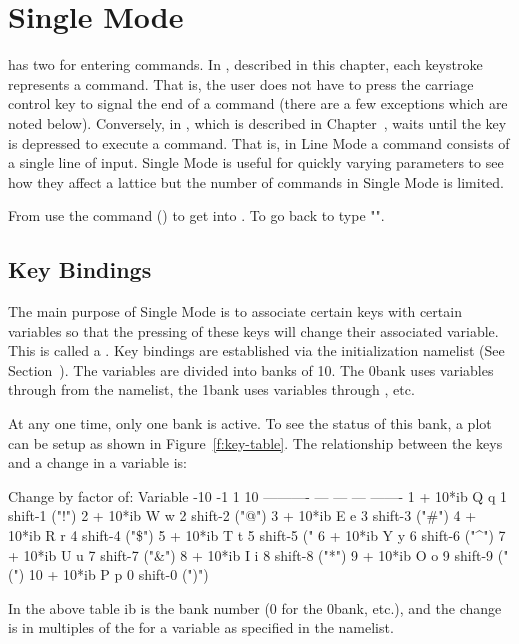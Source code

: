 \chapter{Single Mode}
\label{c:single}

\tao has two  for entering commands. In ,
described in this chapter, each keystroke represents a command.  That
is, the user does not have to press the carriage control key to signal
the end of a command (there are a few exceptions which are noted
below). Conversely, in , which is described in
Chapter~, \tao waits until the  key is
depressed to execute a command. That is, in Line Mode a command
consists of a single line of input.  Single Mode is useful for quickly
varying parameters to see how they affect a lattice but the number of
commands in Single Mode is limited.

From  use the  command ()
to get into . To go back to  type
"".

\section{Key Bindings}
\label{s:key-bind}

The main purpose of Single Mode is to associate certain keys with
certain variables so that the pressing of these keys will change their
associated variable. This is called a .  Key bindings
are established via the  initialization namelist (See
Section~). The variables are divided into banks of
10. The 0\Th bank uses variables  through  from
the  namelist, the 1\St bank uses variables
 through , etc.  

At any one time, only one bank is active. To see the status of this
bank, a  plot can be setup as shown in
Figure~\ref{f:key-table}. The relationship between the keys and a
change in a variable is:
\begin{example}
                 Change by factor of:          
     Variable    -10  -1    1     10
   ----------    ---  ---  ---  -------
    1 + 10*ib     Q    q    1   shift-1   ("!")
    2 + 10*ib     W    w    2   shift-2   ("@")
    3 + 10*ib     E    e    3   shift-3   ("\#")
    4 + 10*ib     R    r    4   shift-4   ("\$")
    5 + 10*ib     T    t    5   shift-5   ("%
    6 + 10*ib     Y    y    6   shift-6   ("^")
    7 + 10*ib     U    u    7   shift-7   ("\&")
    8 + 10*ib     I    i    8   shift-8   ("*")
    9 + 10*ib     O    o    9   shift-9   ("(")
   10 + 10*ib     P    p    0   shift-0   (")")
\end{example}
In the above table ib is the bank number (0 for the 0\Th bank, etc.),
and the change is in multiples of the  for a variable as
specified in the  namelist. 

